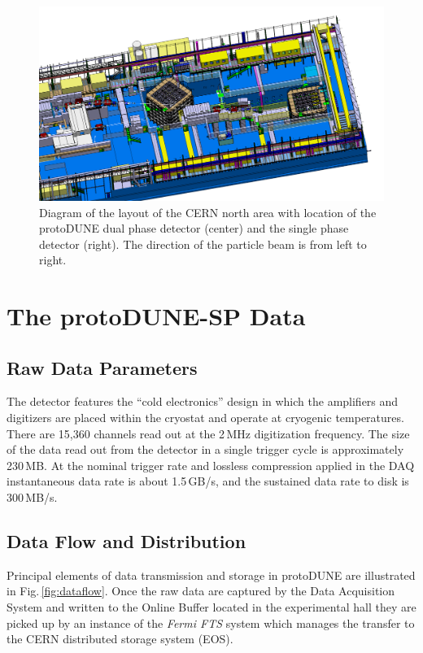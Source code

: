 \documentclass{webofc}
\newcommand{\pd}{protoDUNE\xspace}
\begin{document}
\begin{figure}[tb]
\centering\includegraphics[width=1.0\textwidth]{figures/np02np04.png}
\caption{\label{fig:np02np04}Diagram of the layout of the CERN north area with
  location of the protoDUNE dual phase detector (center) and the single
  phase detector (right). The direction of the particle beam is from left to right.}
\end{figure}

\section{The protoDUNE-SP Data}
\subsection{Raw Data Parameters}
\label{sec:np04_data_rate}

The detector features the ``cold electronics'' design in which the amplifiers and digitizers
are placed within the cryostat and operate at cryogenic temperatures.
There are 15,360 channels read out at the 2\,MHz digitization frequency. The size of the data
read out from the detector in a single trigger cycle is approximately 230\,MB. At the nominal
trigger rate and lossless compression applied in the DAQ instantaneous data rate is about
1.5\,GB/s, and the sustained data rate to disk is 300\,MB/s.

\subsection{Data Flow and Distribution}
Principal elements of data transmission and storage in \pd are illustrated in Fig.\,\ref{fig:dataflow}.
Once the raw data are captured by the Data Acquisition System and written to the Online Buffer
located in the experimental hall  they are picked up by an instance of the \textit{Fermi FTS} system
\cite{sam,fts} which manages the transfer to the CERN distributed storage system (EOS).
\end{document}
